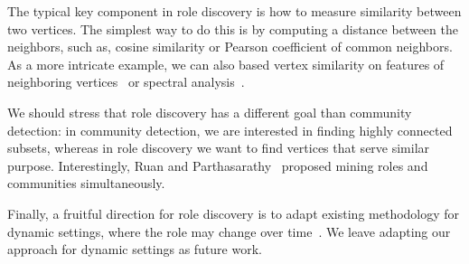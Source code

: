 The typical key component in role discovery is how to measure similarity
between two vertices. The simplest way to do this is by computing a distance
between the neighbors, such as, cosine similarity or Pearson coefficient of
common neighbors.  As a more intricate example, we can also based vertex
similarity on features of neighboring vertices~\cite{yang2015network} or
spectral analysis~\cite{tsourakakis2014toward}.


We should stress that role discovery has a different goal than community
detection: in community detection, we are interested in finding highly
connected subsets, whereas in role discovery we want to find vertices that
serve similar purpose. Interestingly, Ruan and Parthasarathy~\cite{ruan2014simultaneous}
proposed mining roles and communities simultaneously.

Finally, a fruitful direction for role discovery is to adapt existing
methodology for dynamic settings, where the role
may change over time~\cite{abnar2015ssrm,li2013learning}. We leave adapting
our approach for dynamic settings as future work.
